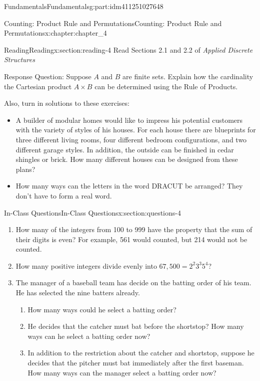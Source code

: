 \documentclass[oneside,10pt,]{book}
\numberwithin{equation}{section}
\begin{document}
\begin{partptx}{Fundamentals}{}{Fundamentals}{}{}{g:part:idm411251027648}
\begin{chapterptx}{Counting: Product Rule and Permutations}{}{Counting: Product Rule and Permutations}{}{}{x:chapter:chapter_4}
\index{}%
%
%
\typeout{************************************************}
\typeout{************************************************}
%
\begin{sectionptx}{Reading}{}{Reading}{}{}{x:section:reading-4}
Read Sections 2.1 and 2.2 of \emph{Applied Discrete Structures}%
\par
Response Question:  Suppose \(A\) and \(B\) are finite sets.  Explain how the cardinality the Cartesian product \(A \times B\) can be determined using the Rule of Products.%
\par
Also, turn in solutions to these exercises:%
\begin{itemize}[label=\textbullet]
\item{}A builder of modular homes would like to impress his potential customers with the variety of styles of his houses. For each house there are blueprints for three different living rooms, four different bedroom configurations, and two different garage styles. In addition, the outside can be finished in cedar shingles or brick. How many different houses can be designed from these plans?%
\item{}How many ways can the letters in the word DRACUT be arranged? They don't have to form a real word.%
\end{itemize}
%
\end{sectionptx}
%
%
\typeout{************************************************}
\typeout{************************************************}
%
\begin{sectionptx}{In-Class Questions}{}{In-Class Questions}{}{}{x:section:questions-4}
%
\begin{enumerate}[label=\arabic*.]
\item{}How many of the integers from 100 to 999 have the property that the sum of their digits is even? For example, 561 would counted, but 214 would not be counted.%
\item{}How many positive integers divide evenly into \(67,500=2^2 3^3 5^4\)?%
\item{}The manager of a baseball team has decide on the batting order of his team.  He has selected the nine batters already.%
\begin{enumerate}[label=(\alph*)]
\item{}How many ways could he select a batting order?%
\item{}He decides that the catcher must bat before the shortstop?  How many ways can he select a batting order now?%
\item{}In addition to the restriction about the catcher and shortstop, suppose he decides that the pitcher must bat immediately after the first baseman.  How many ways can the manager select a batting order now?%

\end{enumerate}
\end{enumerate}
\end{sectionptx}
\end{chapterptx}
\end{partptx}
\end{document}
